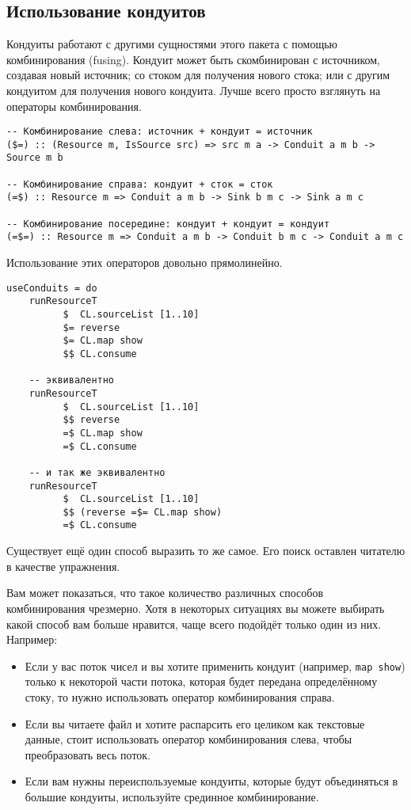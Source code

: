 \subsection{Использование кондуитов}
Кондуиты работают с другими сущностями этого пакета с помощью комбинирования (fusing).
Кондуит может быть скомбинирован с источником, создавая новый источник;
со стоком для получения нового стока; или с другим кондуитом для получения
нового кондуита. Лучше всего просто взглянуть на операторы комбинирования.
\begin{lstlisting}
-- Комбинирование слева: источник + кондуит = источник
($=) :: (Resource m, IsSource src) => src m a -> Conduit a m b -> Source m b

-- Комбинирование справа: кондуит + сток = сток
(=$) :: Resource m => Conduit a m b -> Sink b m c -> Sink a m c

-- Комбинирование посередине: кондуит + кондуит = кондуит
(=$=) :: Resource m => Conduit a m b -> Conduit b m c -> Conduit a m c
\end{lstlisting}
Использование этих операторов довольно прямолинейно.
\begin{lstlisting}
useConduits = do
    runResourceT
          $  CL.sourceList [1..10]
          $= reverse
          $= CL.map show
          $$ CL.consume

    -- эквивалентно
    runResourceT
          $  CL.sourceList [1..10]
          $$ reverse
          =$ CL.map show
          =$ CL.consume

    -- и так же эквивалентно
    runResourceT
          $  CL.sourceList [1..10]
          $$ (reverse =$= CL.map show)
          =$ CL.consume
\end{lstlisting}
Существует ещё один способ выразить то же самое. Его поиск оставлен читателю
 в качестве упражнения.

Вам может показаться, что такое количество различных способов комбинирования
чрезмерно. Хотя в некоторых ситуациях вы можете выбирать какой способ вам больше нравится,
чаще всего подойдёт только один из них. Например:

\begin{itemize}
\item Если у вас поток чисел и вы хотите применить кондуит (например,
\lstinline'map show') только к некоторой части потока, которая будет передана
определённому стоку, то нужно использовать оператор комбинирования справа.
\item Если вы читаете файл и хотите распарсить его целиком как текстовые данные,
стоит использовать оператор комбинирования слева, чтобы преобразовать весь поток.
\item Если вам нужны переиспользуемые кондуиты, которые будут объединяться в
большие кондуиты, используйте срединное комбинирование.
\end{itemize}


